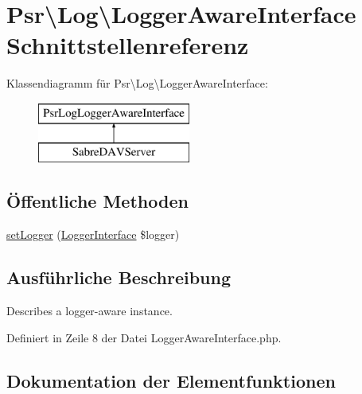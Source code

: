 \hypertarget{interface_psr_1_1_log_1_1_logger_aware_interface}{}\section{Psr\textbackslash{}Log\textbackslash{}Logger\+Aware\+Interface Schnittstellenreferenz}
\label{interface_psr_1_1_log_1_1_logger_aware_interface}
Klassendiagramm für Psr\textbackslash{}Log\textbackslash{}Logger\+Aware\+Interface\+:\begin{figure}[H]
\begin{center}
\leavevmode
\includegraphics[height=2.000000cm]{interface_psr_1_1_log_1_1_logger_aware_interface}
\end{center}
\end{figure}
\subsection*{Öffentliche Methoden}
\begin{DoxyCompactItemize}
\item 
\mbox{\hyperlink{interface_psr_1_1_log_1_1_logger_aware_interface_a36a9007ab01cf2607822eba3d168f392}{set\+Logger}} (\mbox{\hyperlink{interface_psr_1_1_log_1_1_logger_interface}{Logger\+Interface}} \$logger)
\end{DoxyCompactItemize}


\subsection{Ausführliche Beschreibung}
Describes a logger-\/aware instance. 

Definiert in Zeile 8 der Datei Logger\+Aware\+Interface.\+php.



\subsection{Dokumentation der Elementfunktionen}
\mbox{\label{interface_psr_1_1_log_1_1_logger_aware_interface_a36a9007ab01cf2607822eba3d168f392}} 
